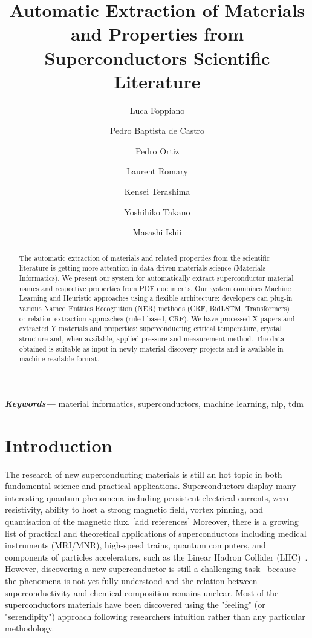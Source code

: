 \documentclass{article}
\title{Automatic Extraction of Materials and Properties from Superconductors Scientific Literature}
\author[1]{Luca Foppiano}
\author[2]{Pedro Baptista de Castro}
\author[3]{Pedro Ortiz}
\author[4]{Laurent Romary}
\author[2]{Kensei Terashima}
\author[2]{Yoshihiko Takano}
\author[1]{Masashi Ishii}
\affil[1]{Material Database Group, MaDIS, NIMS, Tsukuba, Japan}
\affil[2]{Nano Frontier Superconducting Materials Group, MANA, NIMS, Tsukuba, Japan}
\affil[3]{Data and Web Science Group, University of Mannheim, Germany}
\affil[4]{ALMAnaCH, Inria, Paris, France}
\providecommand{\keywords}[1]
{
  \small	
  \textbf{\textit{Keywords---}} #1
}
\begin{document}
\maketitle

\begin{abstract}
The automatic extraction of materials and related properties from the scientific literature is getting more attention in data-driven materials science (Materials Informatics). 
We present our system for automatically extract superconductor material names and respective properties from PDF documents.
Our system combines Machine Learning and Heuristic approaches using a flexible architecture: developers can plug-in various Named Entities Recognition (NER) methods (CRF, BidLSTM, Transformers) or relation extraction approaches (ruled-based, CRF).
We have processed X papers and extracted Y materials and properties: superconducting critical temperature, crystal structure and, when available, applied pressure and measurement method.
The data obtained is suitable as input in newly material discovery projects and is available in machine-readable format.
\end{abstract}

\keywords{material informatics, superconductors, machine learning, nlp, tdm}

\section{Introduction}
The research of new superconducting materials is still an hot topic in both fundamental science and practical applications.
Superconductors display many interesting quantum phenomena including persistent electrical currents, zero-resistivity, ability to host a strong magnetic field, vortex pinning, and quantisation of the magnetic flux. [add references]
Moreover, there is a growing list of practical and theoretical applications of superconductors including medical instruments (MRI/MNR), high-speed trains, quantum computers, and components of particles accelerators, such as the Linear Hadron Collider (LHC)~\cite{PhilippeBook, Kizu2010ConstructionOT, Cardani2017NewAO}.
However, discovering a new superconductor is still a challenging task~\cite{PhysRevB.103.014509, doi:10.1088/1468-6996/16/3/033503} because the phenomena is not yet fully understood and the relation between superconductivity and chemical composition remains unclear. 
Most of the superconductors materials have been discovered using the "feeling" (or "serendipity") approach following researchers intuition rather than any particular methodology.~\cite{doi:10.1080/08957959.2019.1695253}
\end{document}
